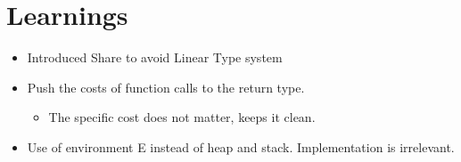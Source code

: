 \section{Learnings}
\begin{itemize}
	\item Introduced Share to avoid Linear Type system
	\item Push the costs of function calls to the return type. 
	   \begin{itemize}
	   	\item The specific cost does not matter, keeps it clean.
	   \end{itemize}
	\item Use of environment E instead of heap and stack. Implementation is irrelevant.
\end{itemize}
